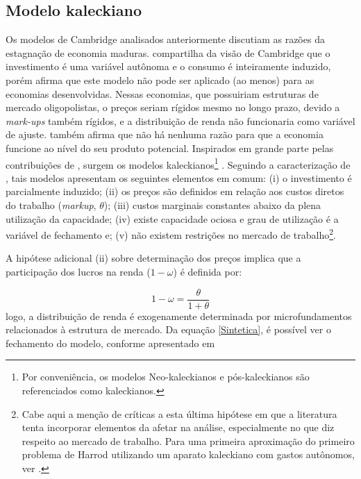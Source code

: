 \subsection{Modelo kaleckiano}


Os modelos de Cambridge analisados anteriormente discutiam as razões da estagnação de economia maduras. \textcite{steindl_stagnation_1979} compartilha da visão de Cambridge que o investimento é uma variável autônoma e o consumo é inteiramente induzido, porém afirma que este modelo não pode ser aplicado (ao menos) para as economias desenvolvidas. Nessas economias, que possuiriam estruturas de mercado oligopolistas, o preços seriam rígidos mesmo no longo prazo, devido a \textit{mark-ups} também rígidos, e a distribuição de renda não funcionaria como variável de ajuste. \citeauthor{steindl_stagnation_1979} também afirma que não há nenhuma razão para que a economia funcione ao nível do seu produto potencial. 
Inspirados em grande parte pelas contribuições de \textcite{steindl_stagnation_1979}, surgem os modelos kaleckianos\footnote{Por conveniência, os modelos Neo-kaleckianos e pós-kaleckianos são referenciados como kaleckianos.} \cites{rowthorn_demand_1981}{dutt_stagnation_1984}{taylor_stagnationist_1985}{amadeo_role_1986}{bhaduri_unemployment_1990}. Seguindo a caracterização de \textcite[p.~790]{lavoie_kaleckian_1995}, tais modelos apresentam os seguintes elementos em comum: (i) o investimento é parcialmente induzido; (ii) os preços são definidos em relação aos custos diretos do trabalho (\textit{markup}, $\theta$); (iii) custos marginais constantes abaixo da plena utilização da capacidade; (iv) existe capacidade ociosa e grau de utilização é a variável de fechamento e; (v) não existem restrições no mercado de trabalho\footnote{Cabe aqui a menção de críticas a esta última hipótese em que a literatura tenta incorporar elementos da afetar na análise, especialmente no que diz respeito ao mercado de trabalho. Para uma primeira aproximação do primeiro problema de Harrod utilizando um aparato kaleckiano com gastos autônomos, ver \textcite{allain_demographic_2018}.}. 

A hipótese adicional (ii) sobre determinação dos preços implica que a participação dos lucros na renda ($1-\omega$) é definida por:

$$
1- \omega = \frac{\theta}{1+\theta}
$$
logo, a distribuição de renda é exogenamente determinada por microfundamentos relacionados à estrutura de mercado. 
Da equação \ref{Sintetica}, é possível ver o fechamento do modelo, conforme apresentado em \textcite{serrano_har_2018}

